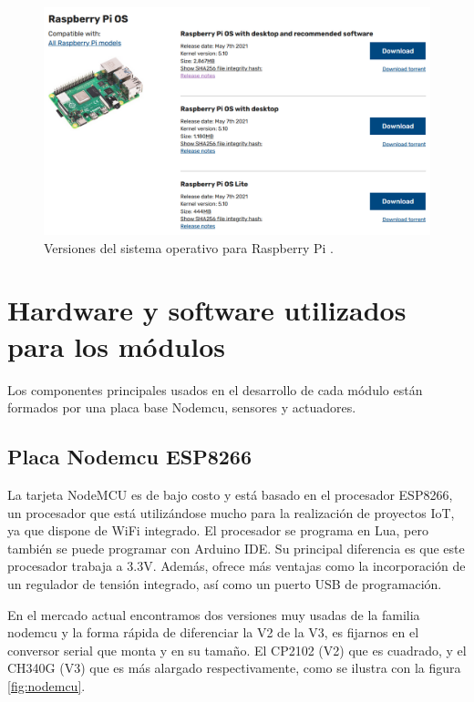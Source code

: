 \begin{figure}[htbp]
	\centering
	\includegraphics[width=.95\textwidth]{./Figures/so.png}
	\caption{Versiones del sistema operativo para Raspberry Pi \protect\footnotemark.}
	\label{fig:so}
\end{figure}


\section{Hardware y software utilizados para los módulos}

Los componentes principales usados en el desarrollo de cada módulo están formados por una placa base Nodemcu, sensores y actuadores.

\subsection{Placa Nodemcu ESP8266}

La tarjeta NodeMCU es de bajo costo y está basado en el procesador ESP8266, un procesador que está utilizándose mucho para la realización de proyectos IoT, ya que dispone de WiFi integrado. El procesador se programa en Lua, pero también se puede programar con Arduino IDE. Su principal diferencia es que este procesador trabaja a 3.3V.  Además, ofrece más ventajas como la incorporación de un regulador de tensión integrado, así como un puerto USB de programación. 

En el mercado actual encontramos dos versiones muy usadas de la familia nodemcu y la forma rápida de diferenciar la V2 de la V3, es fijarnos en el conversor serial que monta y en su tamaño. El CP2102 (V2) que es cuadrado, y el CH340G (V3) que es más alargado respectivamente, como se ilustra con la figura \ref{fig:nodemcu}.
 

